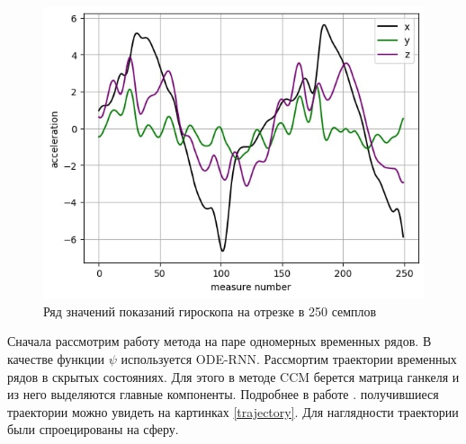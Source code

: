 \documentclass[12pt, twoside]{article}
\begin{document}
\begin{figure}
	\centering
	\includegraphics[scale=0.75]{images/ряд.jpg} 
	\caption{Ряд значений показаний гироскопа на отрезке в 250 семплов \label{ряд}}
\end{figure}


	Сначала рассмотрим работу метода на паре одномерных временных рядов. В качестве функции $\psi$ используется ODE-RNN.
	Рассмортим траектории временных рядов в скрытых состояниях. Для этого в методе CCM берется матрица ганкеля и из него выделяются главные компоненты. Подробнее в работе \cite{Usmanova2018}.  
	получившиеся траектории можно увидеть на картинках \ref{trajectory}. Для наглядности траектории были спроецированы на сферу.
	
\end{document}
